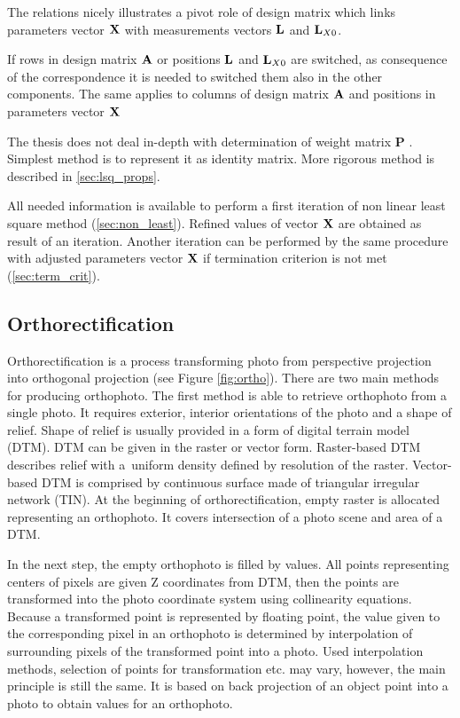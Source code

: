 \documentclass[a4paper,12pt]{article}
\newcommand{\ematr}[1]{%
{\bf #1}%
}
\newcommand{\evect}[1]{%
{\bf #1}%
}
\begin{document}
The relations nicely illustrates a pivot role of design matrix which links parameters vector $\evect{X}$ 
with measurements vectors $\evect{L}$ and $\evect{L}_{X0}$.

If rows in design matrix $\evect{A}$ or positions $\evect{L}$ and $\evect{L}_{X0}$ are switched,
as consequence of the correspondence it is needed to switched them also in the other components. 
The same applies to columns  of design matrix $\evect{A}$  and positions in parameters vector $\evect{X}$

The thesis does not deal in-depth with determination of weight matrix \ematr{P}. 
Simplest method is to represent it as identity matrix. More rigorous method is described in \ref{sec:lsq_props}. 

All needed information is available to perform a first iteration of non linear least square 
method (\ref{sec:non_least}).  Refined values of vector  $\evect{X}$ are obtained as result of an iteration. 
Another iteration can be  performed by the same procedure  with adjusted parameters vector $\evect{X}$
if termination criterion is not met (\ref{sec:term_crit}).

\subsection{Orthorectification}
\label{sec:ortho}

Orthorectification is a process transforming photo from perspective projection into orthogonal projection (see Figure \ref{fig:ortho}). 
There are two main methods for producing orthophoto. The first method is able to retrieve orthophoto 
from a single photo. It requires exterior, interior orientations of the photo and a shape of relief. 
Shape of relief is usually provided in a form of digital terrain model (DTM). DTM 
can be given in the raster or vector form. Raster-based DTM describes relief with a~uniform density defined 
by resolution of the raster.
Vector-based DTM is comprised by continuous surface made of triangular irregular network (TIN). 
At the beginning of orthorectification, empty raster is allocated representing an orthophoto.
It covers intersection of a photo scene and area of a DTM.

In the next step, the empty orthophoto is filled by values. 
All points representing centers of pixels are given Z coordinates from DTM,
then the points are transformed into the photo coordinate system using collinearity equations.
Because a transformed point is represented by floating point, the value given 
to the corresponding pixel in an orthophoto is determined by interpolation of surrounding pixels of the transformed 
point into a photo.  Used interpolation methods, selection of points 
for transformation etc. may vary, however, 
 the main principle is still the same. It is based on back projection of  an object point into 
a photo to obtain values for an orthophoto.
\end{document}
